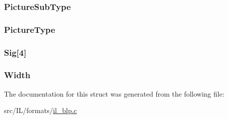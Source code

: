 \hypertarget{struct_b_l_p1_h_e_a_d_aaf9e7209b2ac1b7a95e99dcbb0cc7292}{
\subsubsection[{Picture\-Sub\-Type}]{ Picture\-Sub\-Type}}\label{struct_b_l_p1_h_e_a_d_aaf9e7209b2ac1b7a95e99dcbb0cc7292}
\hypertarget{struct_b_l_p1_h_e_a_d_a8120371caf872d5b05cc54a515fd21a1}{
\subsubsection[{Picture\-Type}]{ Picture\-Type}}\label{struct_b_l_p1_h_e_a_d_a8120371caf872d5b05cc54a515fd21a1}
\hypertarget{struct_b_l_p1_h_e_a_d_a44e23e3cb794abbb3bf035a7c72e0a14}{
\subsubsection[{Sig}]{ Sig\mbox{[}4\mbox{]}}}\label{struct_b_l_p1_h_e_a_d_a44e23e3cb794abbb3bf035a7c72e0a14}
\hypertarget{struct_b_l_p1_h_e_a_d_a4146e7b2b0b4097e0e335f9b348392bf}{
\subsubsection[{Width}]{ Width}}\label{struct_b_l_p1_h_e_a_d_a4146e7b2b0b4097e0e335f9b348392bf}


The documentation for this struct was generated from the following file\-:\begin{DoxyCompactItemize}
\item 
src/\-I\-L/formats/\hyperlink{il__blp_8c}{il\-\_\-blp.\-c}\end{DoxyCompactItemize}
